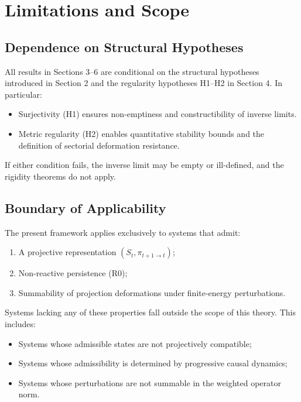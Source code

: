 \documentclass[11pt,a4paper]{article}
\theoremstyle{plain}
\theoremstyle{definition}
\theoremstyle{remark}
\begin{document}
\section{Limitations and Scope}

\subsection{Dependence on Structural Hypotheses}

All results in Sections 3--6 are conditional on the structural hypotheses introduced in Section 2 and the regularity hypotheses H1--H2 in Section 4. In particular:
\begin{itemize}[leftmargin=*]
    \item Surjectivity (H1) ensures non-emptiness and constructibility of inverse limits.
    \item Metric regularity (H2) enables quantitative stability bounds and the definition of sectorial deformation resistance.
\end{itemize}

If either condition fails, the inverse limit may be empty or ill-defined, and the rigidity theorems do not apply.

\subsection{Boundary of Applicability}

The present framework applies exclusively to systems that admit:
\begin{enumerate}[leftmargin=*]
    \item A projective representation $(S_t, \pi_{t+1 \to t})$;
    \item Non-reactive persistence (R0);
    \item Summability of projection deformations under finite-energy perturbations.
\end{enumerate}

Systems lacking any of these properties fall outside the scope of this theory. This includes:
\begin{itemize}[leftmargin=*]
    \item Systems whose admissible states are not projectively compatible;
    \item Systems whose admissibility is determined by progressive causal dynamics;
    \item Systems whose perturbations are not summable in the weighted operator norm.
\end{itemize}
\end{document}
